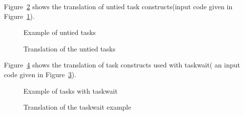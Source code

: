 Figure~\ref{Manual:omp:task_untied3-trans} shows the translation of untied task constructs(input code given in
Figure~\ref{Manual:omp:task_untied3}). 

\lstset{language=C,basicstyle=\scriptsize}
\begin{figure}[htbp]
{\indent
  {\mySmallFontSize
    \begin{latexonly}
    
    \end{latexonly}
    \begin{htmlonly}
    
    \end{htmlonly}
  }
}
\caption{Example of untied tasks}
\label{Manual:omp:task_untied3}
\end{figure}

\begin{figure}[htbp]
{\indent
  {\mySmallFontSize
    \begin{latexonly}
    
    \end{latexonly}
    \begin{htmlonly}
    
    \end{htmlonly}
  }
}
\caption{Translation of the untied tasks}
\label{Manual:omp:task_untied3-trans}
\end{figure}

Figure~\ref{Manual:omp:task_wait-trans} shows the translation of task constructs used with taskwait( an input code given in
Figure~\ref{Manual:omp:task_wait}). 

\lstset{language=C,basicstyle=\scriptsize}
\begin{figure}[htbp]
{\indent
  {\mySmallFontSize
    \begin{latexonly}
    
    \end{latexonly}
    \begin{htmlonly}
    
    \end{htmlonly}
  }
}
\caption{Example of tasks with taskwait}
\label{Manual:omp:task_wait}
\end{figure}

\begin{figure}[htbp]
{\indent
  {\mySmallFontSize
    \begin{latexonly}
    
    \end{latexonly}
    \begin{htmlonly}
    
    \end{htmlonly}
  }
}
\caption{Translation of the taskwait example}
\label{Manual:omp:task_wait-trans}
\end{figure}

